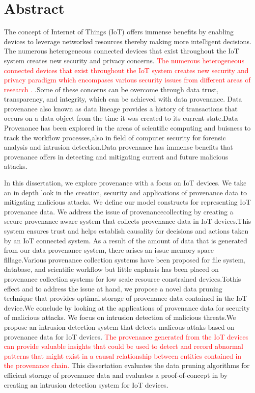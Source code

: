 

\chapter*{Abstract}
The concept of Internet of Things (IoT) offers immense benefits by
enabling devices to leverage networked resources thereby making more intelligent
decisions. The numerous heterogeneous connected devices that exist throughout
the IoT system creates new security and privacy concerns. \textcolor{red}{The numerous heterogeneous connected devices that exist throughout
the IoT system creates new security and privacy paradigm which encompases various security issues from different areas of research .} .Some of these concerns can
be overcome through data trust, transparency, and integrity, which can be
achieved with data provenance. Data provenance also known as data lineage provides a history of transactions that occurs on a data object from the time it was created to its current state.Data Provenance has been explored in the areas of scientific computing and buisness to track the workflow processes,also in field of computer security for forensic analysis and intrusion detection.Data provenance has immense benefits that provenance offers in detecting and mitigating current and future malicious attacks.  \par In this dissertation, we explore provenance with a focus on IoT devices. We take an in depth look  in the creation, security and applications of provenance data to mitigating malicious attacks. We define our model constructs for representing IoT provenance data. We address the issue of provenancecollecting by creating a secure provenance aware system that collects provenance data in IoT devices.This system ensures trust and helps establish causality for decisions and actions taken by an IoT connected system. As a result of the amount of data that is generated from our data provenance system, there arises an issue memory space fillage.Various provenance collection systems have been proposed for file system, database, and scientific workflow but little enphasis has been placed on provenance collection systems for low scale resource constrained devices.Tothis effect and to address the issue at hand, we propose a novel data pruning technique that provides optimal storage of provenance data contained in the IoT device.We conclude by looking at the applications of provenance data for security of malicious attacks. We focus on intrusion detection of malicious threats.We propose an intrusion detection system that detects malicous attaks based on provenance data for IoT devices. \textcolor{red}{The provenance generated from the IoT devices can provide valuable insights that could be used to detect and record abnormal patterns that might exist in a causal relationship between entities contained in the provenance chain.} This dissertation evaluates the data pruning algorithms for efficient storage of provenance data and evaluates a proof-of-concept in by creating an intrusion detection system for IoT devices.


